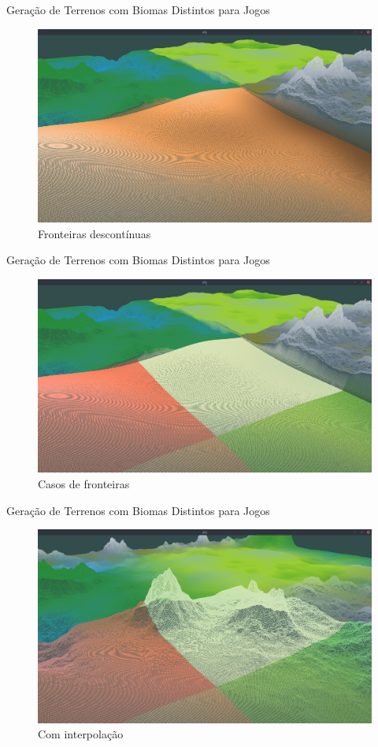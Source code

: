 \begin{frame}{Geração de Terrenos com Biomas Distintos para Jogos}
  \begin{figure}
		\centering
        \includegraphics[width=.8\textwidth]
        {img/uffs/interpolationArea/notinter.png}
        \caption{Fronteiras descontínuas}
  \end{figure}
\end{frame}

\begin{frame}{Geração de Terrenos com Biomas Distintos para Jogos}
  \begin{figure}
		\centering
        \includegraphics[width=.8\textwidth]
        {img/uffs/interpolationArea/showareanotinterpo.png}
        \caption{Casos de fronteiras}
  \end{figure}
\end{frame}

\begin{frame}{Geração de Terrenos com Biomas Distintos para Jogos}
  \begin{figure}
		\centering
        \includegraphics[width=.8\textwidth]
        {img/uffs/interpolationArea/showareainterpolating.png}
        \caption{Com interpolação}
  \end{figure}
\end{frame}

